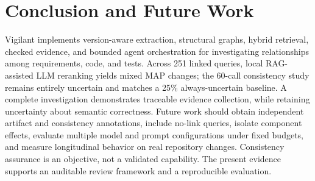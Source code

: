 \documentclass[conference,letterpaper,10pt]{IEEEtran}
\begin{document}
\section{Conclusion and Future Work}
Vigilant implements version-aware extraction, structural graphs, hybrid retrieval, checked evidence, and bounded agent orchestration for investigating relationships among requirements, code, and tests. Across 251 linked queries, local RAG-assisted LLM reranking yields mixed MAP changes; the 60-call consistency study remains entirely uncertain and matches a 25\% always-uncertain baseline. A complete investigation demonstrates traceable evidence collection, while retaining uncertainty about semantic correctness. Future work should obtain independent artifact and consistency annotations, include no-link queries, isolate component effects, evaluate multiple model and prompt configurations under fixed budgets, and measure longitudinal behavior on real repository changes. Consistency assurance is an objective, not a validated capability. The present evidence supports an auditable review framework and a reproducible evaluation.
\balance
\end{document}
